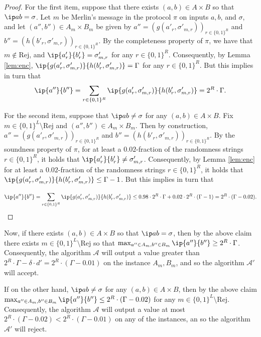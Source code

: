\documentclass[11pt]{article}
\theoremstyle{plain}
\theoremstyle{remark}
\newcommand{\rej}{\mathrm{Rej}}
\begin{document}
\begin{proof}
For the first item, suppose that there exists  $(a,b) \in A \times B$ so that $\ip a b =\sigma$. Let $m$ be Merlin's message in the protocol $\pi$ on inputs $a,b$, and $\sigma$, and let $(a'',b'') \in A_m \times B_m$ be given by
$a''=(g(a'_r, \sigma'_{m,r}))_{r \in \{0,1\}^R} $ and $b''=( h(b'_r, \sigma'_{m,r}))_{r \in \{0,1\}^R}$. By the completeness property of $\pi$, we have that $m \notin \rej$, and 
$\ip {a'_r} {b'_r} = \sigma'_{m,r}$ for any $r \in \{0,1\}^R$. Consequently, by Lemma \ref{lem:enc}, $\ip {g(a'_r, \sigma'_{m,r}) } 
{ h(b'_r, \sigma'_{m,r})} = \Gamma$ for any $r \in \{0,1\}^R$. But this implies in turn that
$$ \ip {a''} {b''} = \sum_{r \in \{0,1\}^R} \ip {g(a'_r, \sigma'_{m,r}) } { h(b'_r, \sigma'_{m,r})} = 2^R \cdot \Gamma.$$

For the second item, suppose that $\ip a b \neq \sigma$ for any $(a,b) \in A\times B$. Fix $m \in \{0,1\}^L \setminus \rej$ and 
$(a'',b'') \in A_m \times B_m$. Then by construction,  $a''=(g(a'_r, \sigma'_{m,r}))_{r \in \{0,1\}^R} $ and $b''=( h(b'_r, \sigma'_{m,r}))_{r \in \{0,1\}^R}$. By the soundness property of $\pi$, for at least a $0.02$-fraction of the randomness strings $r \in \{0,1\}^R$, it holds that $\ip {a'_r} {b'_r} \neq \sigma'_{m,r}$. Consequently, by Lemma \ref{lem:enc} for at least a $0.02$-fraction of the randomness strings $r \in \{0,1\}^R$, it holds that  $\ip {g(a'_r, \sigma'_{m,r}) } 
{ h(b'_r, \sigma'_{m,r})} \leq \Gamma -1$. But this implies in turn that 


$$\ip {a''} {b''}  =  \sum_{r \in \{0,1\}^R} \ip {g(a'_r, \sigma'_{m,r}) } { h(b'_r, \sigma'_{m,r})}  
 \leq  0.98 \cdot 2^R \cdot \Gamma + 0.02  \cdot 2^R\cdot (\Gamma -1) 
 =   2^R \cdot (\Gamma - 0.02)  .
 $$

\end{proof}

Now, if there exists $(a,b) \in A \times B$ so that $\ip a b =\sigma$, then by the above claim there exists $m \in \{0,1\}^L \setminus \rej$ so that $\max_{a'' \in A_m, b'' \in B_m} \ip {a''} {b''} \geq 2^R \cdot \Gamma$. Consequently, the algorithm $\mathcal A$ will output a value greater than $2^R \cdot \Gamma - \delta \cdot d' = 2^R \cdot (\Gamma - 0.01)$ on the instance $A_m,B_m$, and so the algorithm $\mathcal {A'}$ will accept.

If on the other hand, $\ip a b \neq \sigma$ for any $(a,b) \in A\times B$, then by the above claim $\max_{a'' \in A_m, b'' \in B_m} \ip {a''} {b''} \leq 2^R \cdot (\Gamma - 0.02)$ for any $m \in \{0,1\}^L \setminus \rej$. Consequently, the algorithm $\mathcal A$ will output a value at most $2^R \cdot (\Gamma - 0.02)<2^R \cdot (\Gamma - 0.01)$ on any of the instances, an so the algorithm 
$\mathcal{A}'$ will reject.
\end{document}
